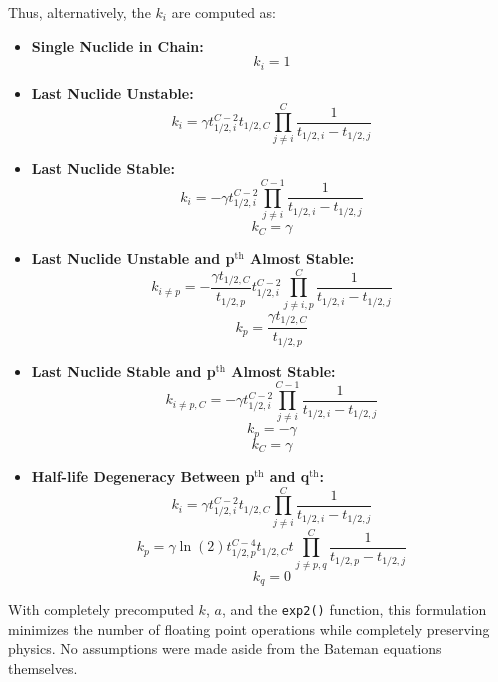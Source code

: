 \documentclass[letterpaper]{physor2018}
\newcommand{\pth}{p$^{\mathrm{th}}$\xspace}
\newcommand{\qth}{q$^{\mathrm{th}}$\xspace}
\begin{document}
Thus, alternatively, the $k_i$ are computed as:
\begin{itemize}
\item \textbf{Single Nuclide in Chain:}
\begin{equation}
\label{k-bin-single}
    k_i = 1
\end{equation}
\item \textbf{Last Nuclide Unstable:}
\begin{equation}
\label{k-bin-unstable}
    k_i = \gamma t_{1/2,i}^{C-2} t_{1/2,C} \prod_{j\ne i}^{C} \frac{1}{t_{1/2,i} - t_{1/2,j}}
\end{equation}
\item \textbf{Last Nuclide Stable:}
\begin{equation}
\label{k-bin-stable-0}
    k_i = -\gamma t_{1/2,i}^{C-2} \prod_{j\ne i}^{C-1} \frac{1}{t_{1/2,i} - t_{1/2,j}}
\end{equation}
\begin{equation}
\label{k-bin-stable-1}
    k_C = \gamma
\end{equation}
\item \textbf{Last Nuclide Unstable and \pth Almost Stable:}
\begin{equation}
\label{k-bin-unstable-p-almost-0}
    k_{i\ne p} = -\frac{\gamma t_{1/2,C}}{t_{1/2,p}} t_{1/2,i}^{C-2} \prod_{j\ne i,p}^C \frac{1}{t_{1/2,i} - t_{1/2,j}}
\end{equation}
\begin{equation}
\label{k-bin-unstable-p-almost-1}
    k_p = \frac{\gamma t_{1/2,C}}{t_{1/2,p}}
\end{equation}
\item \textbf{Last Nuclide Stable and \pth Almost Stable:}
\begin{equation}
\label{k-bin-stable-p-almost-0}
    k_{i\ne p,C} = -\gamma t_{1/2,i}^{C-2} \prod_{j\ne i}^{C-1} \frac{1}{t_{1/2,i} - t_{1/2,j}}
\end{equation}
\begin{equation}
\label{k-bin-stable-p-almost-1}
    k_p = -\gamma
\end{equation}
\begin{equation}
\label{k-bin-stable-p-almost-2}
    k_C = \gamma
\end{equation}
\item \textbf{Half-life Degeneracy Between \pth and \qth:}
\begin{equation}
\label{k-bin-pq-degen-0}
    k_i = \gamma t_{1/2,i}^{C-2} t_{1/2,C} \prod_{j\ne i}^{C} \frac{1}{t_{1/2,i} - t_{1/2,j}}
\end{equation}
\begin{equation}
\label{k-bin-pq-degen-1}
    k_p = \gamma\ln(2) t_{1/2,p}^{C-4} t_{1/2,C}  t \prod_{j\ne p,q}^C \frac{1}{t_{1/2,p} - t_{1/2,j}}
\end{equation}
\begin{equation}
\label{k-bin-pq-degen-2}
    k_q = 0
\end{equation}
\end{itemize}
With completely precomputed $k$, $a$, and the \texttt{exp2()} function, this
formulation minimizes the number of floating point operations while completely
preserving physics. No assumptions were made aside from the Bateman equations
themselves.
\end{document}
